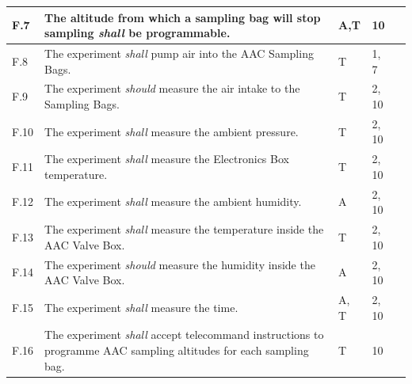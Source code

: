 \documentclass[a4paper,12pt,twoside]{article}
\begin{document}
\begin{longtable}[]{|m{}| m{} |m{} |m{}|m{}|}
F.7  & The altitude from which a sampling bag will stop sampling \textit{shall} be programmable.                                                                                        &    A,T          & 10            &        \\ \hline
F.8  & The experiment \textit{shall} pump air into the AAC Sampling Bags.                                                                                                               &     T        & 1, 7            &        \\ \hline
F.9  & The experiment \textit{should} measure the air intake to the Sampling Bags.                                                                                                      &       T       & 2, 10            &        \\ \hline
F.10 & The experiment \textit{shall} measure the ambient pressure.                                                                                                                      &       T       & 2, 10            &        \\ \hline
F.11 & The experiment \textit{shall} measure the Electronics Box temperature.                                                                                                                   &       T       & 2, 10            &        \\ \hline
F.12 & The experiment \textit{shall} measure the ambient humidity.                                                                                                                      &      A        & 2, 10            &        \\ \hline
F.13 & The experiment \textit{shall} measure the temperature inside the AAC Valve Box.                                                                                                  &      T        & 2, 10            &        \\ \hline
F.14 & The experiment \textit{should} measure the humidity inside the AAC Valve Box.                                                                                                    &      A        & 2, 10            &        \\ \hline
F.15 & The experiment \textit{shall} measure the time.                                                                                                                                  &        A, T      & 2, 10            &        \\ \hline
F.16 & The experiment \textit{shall} accept telecommand instructions to programme AAC sampling altitudes for each sampling bag.                                                         &      T        & 10            &        \\ \hline

\end{longtable}
\end{document}
